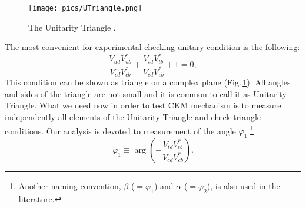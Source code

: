 \documentclass[preprint,aps,showpacs]{revtex4}
\begin{document}
\begin{figure}[htb]
\texttt{[image: pics/UTriangle.png]}
\caption{The Unitarity Triangle \cite{BPhys}.}
\label{fig:UT}
\end{figure}

The most convenient for experimental checking unitary condition is the following:
\begin{equation}\label{eq:unitarity_condition}
 \frac{V_{ud}V^*_{ub}}{V_{cd}V^*_{cb}}+\frac{V_{td}V^*_{tb}}{V_{cd}V^*_{cb}}+1=0,
\end{equation}
This condition can be shown as triangle on a complex plane (Fig.\,\ref{fig:UT}). All angles and sides of the triangle are not small and it is common to call it as Unitarity Triangle. What we need now in order to test CKM mechanism is to measure independently all elements of the Unitarity Triangle and check triangle conditions. Our analysis is devoted to measurement of the angle $\varphi_1$ \footnote{Another naming convention, $\beta$ ($= \varphi_1$) and $\alpha$ ($= \varphi_2$), is also used in the literature.}
\begin{equation}\label{eq:phi1}
 \varphi_1\equiv\arg\left(-\frac{V_{td}V^*_{tb}}{V_{cd}V^*_{cb}}\right).
\end{equation}
\end{document}
